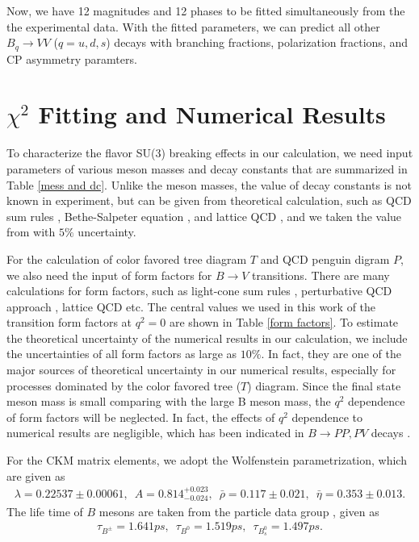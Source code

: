 \documentclass[11pt]{article}
\begin{document}
Now, we have 12   magnitudes and 12  phases to be fitted simultaneously from the the  experimental data. With the fitted  parameters, we can predict all other  $B_q \to VV$ ($q=u,d,s$) decays with  branching fractions, polarization fractions, and CP asymmetry paramters.


\section{$\chi^2$ Fitting and Numerical Results}\label{sec-3}

To characterize the flavor SU(3) breaking effects in our calculation, we need    input parameters  of various meson masses \cite{Agashe:2014kda} and decay constants that are summarized in   Table \ref{mess and dc}. Unlike the meson masses, the value of decay constants is not known in experiment, but can be given from theoretical calculation, such as QCD sum rules \cite{Baker:2013mwa}, Bethe-Salpeter equation \cite{Maris:1999nt}, and lattice QCD \cite{Gray:2005ad}, and we taken the value from \cite{Zhou:2016jkv} with $5\%$ uncertainty.

For the calculation of color favored tree diagram $T$ and QCD penguin digram $P$, we also need the input  of form factors for $B \to V$ transitions.   There are many calculations for form factors, such as light-cone sum rules \cite{sumrule}, perturbative QCD approach \cite{pqcd}, lattice QCD \cite{lqcd} etc. The central values we used in this work of the transition form factors at $q^2=0$ are shown in Table \ref{form factors}. To estimate the theoretical uncertainty of the numerical results in our calculation, we include the uncertainties of all form factors as large as $10\%$. In fact, they are one of the major sources of theoretical uncertainty in our numerical results, especially for processes dominated by the color favored tree ($T$) diagram.  Since the  final state meson mass is small comparing with the large B meson mass, the $q^2$ dependence of form factors will be neglected. In fact, the effects of $q^2$ dependence to numerical results are negligible, which has been indicated in $B\to PP,PV$ decays \cite{Zhou:2016jkv}.

For the CKM matrix elements, we adopt the Wolfenstein parametrization, which are given as \cite{Agashe:2014kda}
\begin{eqnarray}
\lambda = 0.22537 \pm 0.00061,\,\,\, A = 0.814^{+0.023}_{-0.024},\,\,\,
\bar \rho = 0.117 \pm 0.021,\,\,\, \bar \eta = 0.353\pm 0.013.
\end{eqnarray}
 The life time of $B$ mesons are taken from the particle data group \cite{Agashe:2014kda}, given as
\begin{eqnarray}
\tau_{B^\pm}=1.641 ps,\,\,\,\tau_{B^0}=1.519 ps,\,\,\,\tau_{B_s^0}=1.497 ps.
\end{eqnarray}
\end{document}
